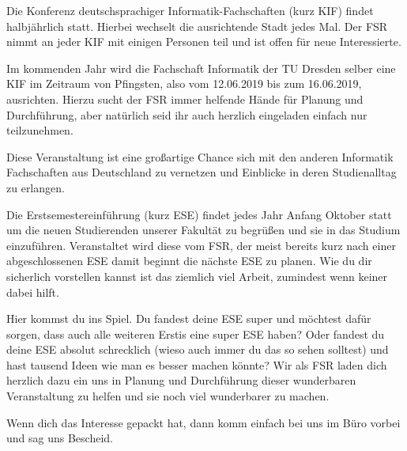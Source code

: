 
Die Konferenz deutschsprachiger Informatik-Fachschaften (kurz KIF) findet halbjährlich statt. Hierbei wechselt die ausrichtende Stadt jedes Mal. Der FSR nimmt an jeder KIF mit einigen Personen teil und ist offen für neue Interessierte.

Im kommenden Jahr wird die Fachschaft Informatik der TU Dresden selber eine KIF im Zeitraum von Pfingsten, also vom 12.06.2019 bis zum 16.06.2019, ausrichten. Hierzu sucht der FSR immer helfende Hände für Planung und Durchführung, aber natürlich seid ihr auch herzlich eingeladen einfach nur teilzunehmen.

Diese Veranstaltung ist eine großartige Chance sich mit den anderen Informatik Fachschaften aus Deutschland zu vernetzen und Einblicke in deren Studienalltag zu erlangen.


Die Erstsemestereinführung (kurz ESE) findet jedes Jahr Anfang Oktober statt um die neuen Studierenden unserer Fakultät zu begrüßen und sie in das Studium einzuführen. Veranstaltet wird diese vom FSR, der meist bereits kurz nach einer abgeschlossenen ESE damit beginnt die nächste ESE zu planen. Wie du dir sicherlich vorstellen kannst ist das ziemlich viel Arbeit, zumindest wenn keiner dabei hilft. 

Hier kommst du ins Spiel. Du fandest deine ESE super und möchtest dafür sorgen, dass auch alle weiteren Erstis eine super ESE haben? Oder fandest du deine ESE absolut schrecklich (wieso auch immer du das so sehen solltest) und hast tausend Ideen wie man es besser machen könnte? Wir als FSR laden dich herzlich dazu ein uns in Planung und Durchführung dieser wunderbaren Veranstaltung zu helfen und sie noch viel wunderbarer zu machen. 

Wenn dich das Interesse gepackt hat, dann komm einfach bei uns im Büro vorbei und sag uns Bescheid.


